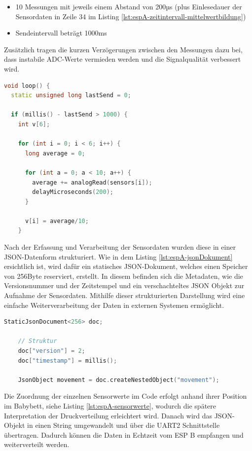 \begin{itemize}
  \item 10 Messungen mit jeweils einem Abstand von 200µs (plus Einlesedauer der Sensordaten in Zeile 34 im Listing \ref{lst:espA-zeitintervall-mittelwertbildung})
  \item Sendeintervall beträgt 1000ms
\end{itemize}

\noindent
Zusätzlich tragen die kurzen Verzögerungen zwischen den Messungen dazu bei, dass instabile ADC-Werte vermieden werden und die Signalqualität verbessert wird.

\begin{lstlisting}[language=C++, caption={Zeitintervall und Mittelwertbildung}, label={lst:espA-zeitintervall-mittelwertbildung}, firstnumber=24]
void loop() {
  static unsigned long lastSend = 0;
  
  if (millis() - lastSend > 1000) {
    int v[6];

    for (int i = 0; i < 6; i++) {
      long average = 0;

      for (int a = 0; a < 10; a++) {
        average += analogRead(sensors[i]);
        delayMicroseconds(200); 
      }

      v[i] = average/10;
    }
\end{lstlisting}

\noindent
Nach der Erfassung und Verarbeitung der Sensordaten wurden diese in einer JSON-Datenform strukturiert. 
Wie in dem Listing \ref{lst:espA-jsonDokument} ersichtlich ist, wird dafür ein statisches JSON-Dokument, welches einen Speicher von 256Byte reserviert, erstellt. In diesem befinden sich die Metadaten, wie die Versionsnummer und der Zeitstempel und ein verschachteltes JSON Objekt zur Aufnahme der Sensordaten. Mithilfe dieser strukturierten Darstellung wird eine einfache Weiterverarbeitung der Daten in externen Systemen ermöglicht.

\begin{lstlisting}[language=C++, caption={JSON-Dokument}, label={lst:espA-jsonDokument}, firstnumber=43]
    StaticJsonDocument<256> doc;

    // Struktur
    doc["version"] = 2;
    doc["timestamp"] = millis();

    JsonObject movement = doc.createNestedObject("movement");
\end{lstlisting}

\noindent
Die Zuordnung der einzelnen Sensorwerte im Code erfolgt anhand ihrer Position im Babybett, siehe Listing \ref{lst:espA-sensorwerte}, wodurch die spätere Interpretation der Druckverteilung erleichtert wird. Danach wird das JSON-Objekt in einen String umgewandelt und über die UART2 Schnittstelle übertragen. Dadurch können die Daten in Echtzeit vom ESP B empfangen und weiterverteilt werden.

